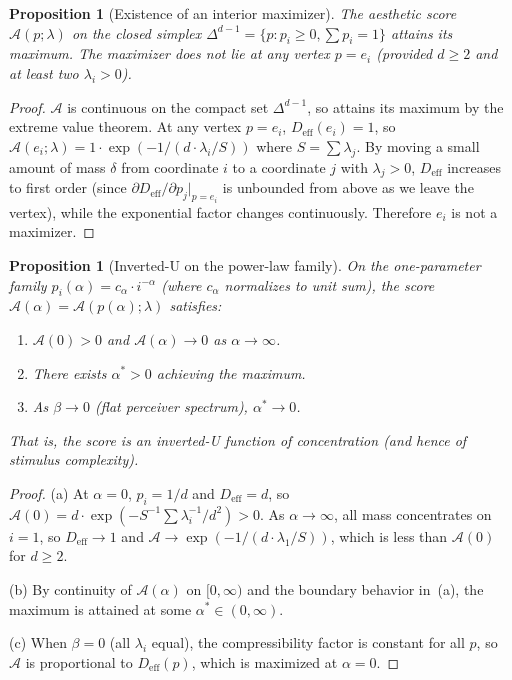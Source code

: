 \documentclass[journal]{IEEEtran}
\newtheorem{proposition}[theorem]{Proposition}
\theoremstyle{definition}
\theoremstyle{remark}
\begin{document}
\begin{proposition}[Existence of an interior maximizer]
\label{prop:existence}
The aesthetic score $\mathcal{A}(p; \lambda)$ on the closed simplex
$\Delta^{d-1} = \{p : p_i \geq 0, \sum p_i = 1\}$ attains its
maximum.  The maximizer does not lie at any vertex $p = e_i$
(provided $d \geq 2$ and at least two $\lambda_i > 0$).
\end{proposition}

\begin{proof}
$\mathcal{A}$ is continuous on the compact set $\Delta^{d-1}$, so
attains its maximum by the extreme value theorem.  At any vertex
$p = e_i$, $D_{\mathrm{eff}}(e_i) = 1$, so $\mathcal{A}(e_i;
\lambda) = 1 \cdot \exp(-1/(d \cdot \lambda_i / S))$ where
$S = \sum \lambda_j$.  By moving a small amount of mass $\delta$
from coordinate $i$ to a coordinate $j$ with $\lambda_j > 0$,
$D_{\mathrm{eff}}$ increases to first order (since
$\partial D_{\mathrm{eff}}/\partial p_j |_{p=e_i}$ is unbounded
from above as we leave the vertex), while the exponential factor
changes continuously.  Therefore $e_i$ is not a maximizer.
\end{proof}

\begin{proposition}[Inverted-U on the power-law family]
\label{prop:berlyne_shape}
On the one-parameter family $p_i(\alpha) = c_\alpha \cdot i^{-\alpha}$
(where $c_\alpha$ normalizes to unit sum), the score
$\mathcal{A}(\alpha) = \mathcal{A}(p(\alpha); \lambda)$ satisfies:
\begin{enumerate}
    \item[(a)] $\mathcal{A}(0) > 0$ and $\mathcal{A}(\alpha) \to 0$
    as $\alpha \to \infty$.
    \item[(b)] There exists $\alpha^* > 0$ achieving the maximum.
    \item[(c)] As $\beta \to 0$ (flat perceiver spectrum),
    $\alpha^* \to 0$.
\end{enumerate}
That is, the score is an inverted-U function of concentration
(and hence of stimulus complexity).
\end{proposition}

\begin{proof}
(a) At $\alpha = 0$, $p_i = 1/d$ and $D_{\mathrm{eff}} = d$, so
$\mathcal{A}(0) = d \cdot \exp(-S^{-1} \sum \lambda_i^{-1} / d^2)
> 0$.  As $\alpha \to \infty$, all mass concentrates on $i = 1$, so
$D_{\mathrm{eff}} \to 1$ and $\mathcal{A} \to \exp(-1/(d \cdot
\lambda_1 / S))$, which is less than $\mathcal{A}(0)$ for $d \geq 2$.

(b) By continuity of $\mathcal{A}(\alpha)$ on $[0, \infty)$ and
the boundary behavior in~(a), the maximum is attained at some
$\alpha^* \in (0, \infty)$.

(c) When $\beta = 0$ (all $\lambda_i$ equal), the compressibility
factor is constant for all $p$, so $\mathcal{A}$ is proportional to
$D_{\mathrm{eff}}(p)$, which is maximized at $\alpha = 0$.
\end{proof}
\end{document}
